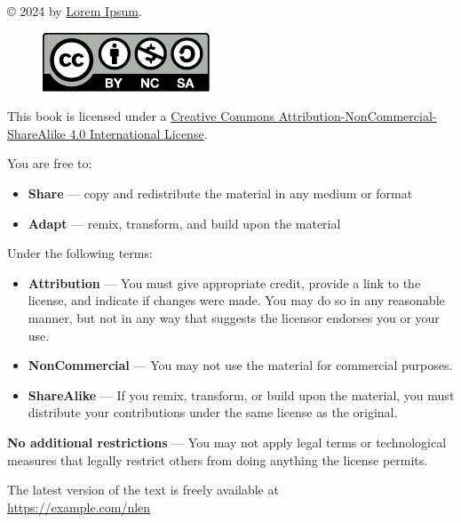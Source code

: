 \thispagestyle{empty}

\vfill

\begin{flushleft}
© 2024 by \href{https://example.com}{Lorem Ipsum}.
\vspace{10mm}
\begin{figure}[h]
\includegraphics{../../resources/licensing/by-nc-sa.pdf}
\end{figure}

This book is licensed under a
\href{http://creativecommons.org/licenses/by-nc-sa/4.0/}{Creative
Commons Attribution-NonCommercial-ShareAlike 4.0 International
License}.
\end{flushleft}

\begin{flushleft}
You are free to:
\end{flushleft}
\begin{itemize}[noitemsep,topsep=-16pt]
\tightlist
\item
\textbf{Share} --- copy and redistribute the material in any medium
or format
\item
\textbf{Adapt} --- remix, transform, and build upon the material
\end{itemize}

\begin{flushleft}
Under the following terms:
\end{flushleft}
\begin{itemize}[noitemsep,topsep=-16pt]
\tightlist
\item
\textbf{Attribution} --- You must give appropriate credit, provide a
link to the license, and indicate if changes were made. You may do so
in any reasonable manner, but not in any way that suggests the
licensor endorses you or your use.
\item
\textbf{NonCommercial} --- You may not use the material for commercial
purposes.
\item
\textbf{ShareAlike} --- If you remix, transform, or build upon the material,
you must distribute your contributions under the same license as the original.
\end{itemize}
\begin{flushleft}
\textbf{No additional restrictions} --- You may not apply legal terms
or technological measures that legally restrict others from doing
anything the license permits.
\end{flushleft}
\vspace{10mm}
{\centering
    The latest version of the text is freely available at\\\href{https://example.com/nlen}{https://example.com/nlen}
\par}
\pagebreak
